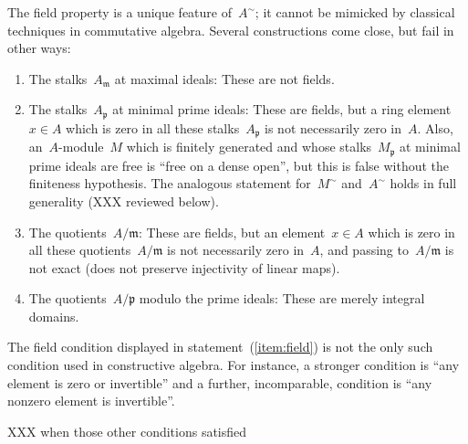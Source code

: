 \documentclass{ws-rv9x6}
\newcommand{\ppp}{\mathfrak{p}}
\newcommand{\mmm}{\mathfrak{m}}
\renewcommand{\_}{\mathpunct{.}}
\newcommand{\?}{\,{:}\,}
\begin{document}
The field property is a unique feature of~$A^\sim$; it cannot be mimicked by
classical techniques in commutative algebra. Several constructions come close,
but fail in other ways:
\begin{enumerate}
\item The stalks~$A_\mmm$ at maximal ideals: These are not fields.
\item The stalks~$A_\ppp$ at minimal prime ideals: These are fields, but a ring
element~$x \in A$ which is zero in all these stalks~$A_\ppp$ is not necessarily
zero in~$A$. Also, an~$A$-module~$M$ which is finitely generated and whose
stalks~$M_\ppp$ at minimal prime ideals are free is ``free on a dense open'',
but this is false without the finiteness hypothesis. The analogous statement
for~$M^\sim$ and~$A^\sim$ holds in full generality (XXX reviewed below).
\item The quotients~$A/\mmm$: These are fields, but an element~$x \in A$ which is
zero in all these quotients~$A/\mmm$ is not necessarily zero in~$A$, and
passing to~$A/\mmm$ is not exact (does not preserve injectivity of linear
maps).
\item The quotients~$A/\ppp$ modulo the prime ideals: These are merely integral
domains.
\end{enumerate}

The field condition displayed in statement~(\ref{item:field}) is not the only
such condition used in constructive algebra. For instance, a stronger condition
is ``any element is zero or invertible'' and a further, incomparable, condition
is ``any nonzero element is invertible''.

XXX when those other conditions satisfied
\end{document}
